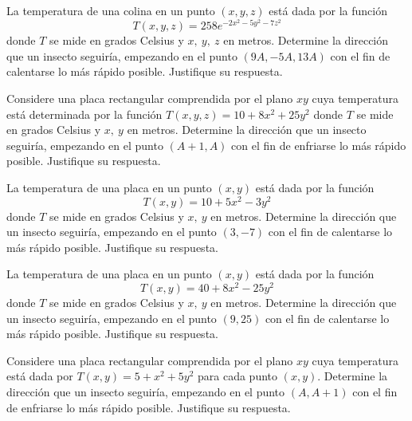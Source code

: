 \begin{prob}
La temperatura de una colina en un punto $(x,y,z)$ está dada por la función $$T(x,y,z)=258e^{-2x^2-5y^2-7z^2}$$ donde $T$ se mide en grados Celsius y $x,\ y, \ z$ en metros.  Determine la dirección que un insecto seguiría, empezando en el punto $(9A,-5A,13A)$ con el fin de calentarse lo más rápido posible. Justifique su respuesta.
\end{prob}

\begin{prob}
Considere una placa rectangular comprendida por el plano $xy$ cuya temperatura está determinada por  la función $T(x,y,z)=10+8x^2+25y^2$ donde $T$ se mide en grados Celsius y $x,\ y$ en metros.  Determine la dirección que un insecto seguiría, empezando en el punto $(A+1,A)$ con el fin de enfriarse lo más rápido posible. Justifique su respuesta.
\end{prob}

\begin{prob}
La temperatura de una placa en un punto $(x,y)$ está dada por la función $$T(x,y)=10+5x^2-3y^2$$ donde $T$ se mide en grados Celsius y $x,\ y$ en metros.  Determine la dirección que un insecto seguiría, empezando en el punto $(3,-7)$ con el fin de calentarse lo más rápido posible. Justifique su respuesta.
\end{prob}

\begin{prob}
La temperatura de una placa en un punto $(x,y)$ está dada por la función $$T(x,y)=40+8x^2-25y^2$$ donde $T$ se mide en grados Celsius y $x,\ y$ en metros.  Determine la dirección que un insecto seguiría, empezando en el punto $(9,25)$ con el fin de calentarse lo más rápido posible. Justifique su respuesta.
\end{prob}

\begin{prob}
Considere una placa rectangular comprendida por el plano $xy$ cuya temperatura está dada por $T(x,y)=5+x^{2}+5y^{2}$ para cada punto $(x,y).$ Determine la dirección que un insecto seguiría, empezando en el punto $(A,A+1)$ con el fin de enfriarse lo más rápido posible. Justifique su respuesta.
\end{prob}

